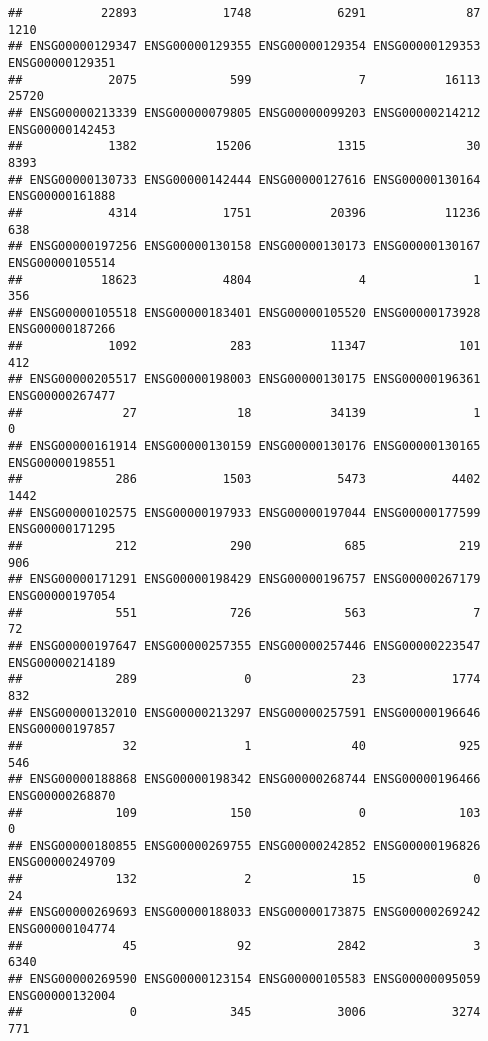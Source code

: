 \documentclass[
]{article}
\begin{document}
\begin{verbatim}
##           22893            1748            6291              87            1210 
## ENSG00000129347 ENSG00000129355 ENSG00000129354 ENSG00000129353 ENSG00000129351 
##            2075             599               7           16113           25720 
## ENSG00000213339 ENSG00000079805 ENSG00000099203 ENSG00000214212 ENSG00000142453 
##            1382           15206            1315              30            8393 
## ENSG00000130733 ENSG00000142444 ENSG00000127616 ENSG00000130164 ENSG00000161888 
##            4314            1751           20396           11236             638 
## ENSG00000197256 ENSG00000130158 ENSG00000130173 ENSG00000130167 ENSG00000105514 
##           18623            4804               4               1             356 
## ENSG00000105518 ENSG00000183401 ENSG00000105520 ENSG00000173928 ENSG00000187266 
##            1092             283           11347             101             412 
## ENSG00000205517 ENSG00000198003 ENSG00000130175 ENSG00000196361 ENSG00000267477 
##              27              18           34139               1               0 
## ENSG00000161914 ENSG00000130159 ENSG00000130176 ENSG00000130165 ENSG00000198551 
##             286            1503            5473            4402            1442 
## ENSG00000102575 ENSG00000197933 ENSG00000197044 ENSG00000177599 ENSG00000171295 
##             212             290             685             219             906 
## ENSG00000171291 ENSG00000198429 ENSG00000196757 ENSG00000267179 ENSG00000197054 
##             551             726             563               7              72 
## ENSG00000197647 ENSG00000257355 ENSG00000257446 ENSG00000223547 ENSG00000214189 
##             289               0              23            1774             832 
## ENSG00000132010 ENSG00000213297 ENSG00000257591 ENSG00000196646 ENSG00000197857 
##              32               1              40             925             546 
## ENSG00000188868 ENSG00000198342 ENSG00000268744 ENSG00000196466 ENSG00000268870 
##             109             150               0             103               0 
## ENSG00000180855 ENSG00000269755 ENSG00000242852 ENSG00000196826 ENSG00000249709 
##             132               2              15               0              24 
## ENSG00000269693 ENSG00000188033 ENSG00000173875 ENSG00000269242 ENSG00000104774 
##              45              92            2842               3            6340 
## ENSG00000269590 ENSG00000123154 ENSG00000105583 ENSG00000095059 ENSG00000132004 
##               0             345            3006            3274             771 

\end{verbatim}
\end{document}
